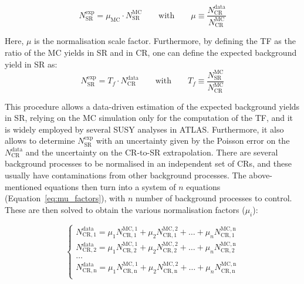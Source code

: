 		\begin{equation}
			N_{\mathrm{SR}}^{\mathrm{exp}} = \mu_{\mathrm{MC}} \cdot N_{\mathrm{SR}}^{\mathrm{MC}} \qquad \mathrm{with}\qquad \mu \equiv \frac{N_{\mathrm{CR}}^{\mathrm{data}}}{N_{\mathrm{CR}}^{\mathrm{MC}}} 
		\label{eq:exp_bkgyield}
		\end{equation}

		\noindent Here, $\mu$ is the normalisation scale factor. Furthermore, by defining the \ac{TF} as the ratio of the \ac{MC} yields in \ac{SR} and in \ac{CR}, one can define the expected background yield in \ac{SR} as: 
		\begin{equation}
			N_{\mathrm{SR}}^{\mathrm{exp}} = T_f \cdot N_{\mathrm{CR}}^{\mathrm{data}} \qquad \mathrm{with} \qquad T_f \equiv \frac{N_{\mathrm{SR}}^{\mathrm{MC}}}{N_{\mathrm{CR}}^{\mathrm{MC}}}
		\label{eq:tf}
		\end{equation}

		\noindent This procedure allows a data-driven estimation of the expected background yields in \ac{SR}, relying on the \ac{MC} simulation only for the computation of the \ac{TF}, and it is widely employed by several \ac{SUSY} analyses in \ac{ATLAS}. Furthermore, it also allows to determine $N_{\mathrm{SR}}^{\mathrm{exp}}$ with an uncertainty given by the Poisson error on the $N_{\mathrm{CR}}^{\mathrm{data}}$ and the uncertainty on the \ac{CR}-to-\ac{SR} extrapolation. There are several background processes to be normalised in an independent set of \acp{CR}, and these usually have contaminations from other background processes. The above-mentioned equations then turn into a system of $n$ equations (Equation~\ref{eq:mu_factors}), with $n$ number of background processes to control. These are then solved to obtain the various normalisation factors ($\mu_i$):

		\begin{equation}
			\begin{cases}
				N_{\mathrm{CR,1}}^{\mathrm{data}} = \mu_1 N_{\mathrm{CR,1}}^{\mathrm{MC,1}} + \mu_2 N_{\mathrm{CR,1}}^{\mathrm{MC,2}} + \dots + \mu_n N_{\mathrm{CR,1}}^{\mathrm{MC,n}} \\
				N_{\mathrm{CR,2}}^{\mathrm{data}} = \mu_1 N_{\mathrm{CR,2}}^{\mathrm{MC,1}} + \mu_2 N_{\mathrm{CR,2}}^{\mathrm{MC,2}} + \dots + \mu_n N_{\mathrm{CR,2}}^{\mathrm{MC,n}} \\
				\dots \\
				N_{\mathrm{CR,n}}^{\mathrm{data}} = \mu_1 N_{\mathrm{CR,n}}^{\mathrm{MC,1}} + \mu_2 N_{\mathrm{CR,n}}^{\mathrm{MC,2}} + \dots + \mu_n N_{\mathrm{CR,n}}^{\mathrm{MC,n}} \\
			\end{cases}
		\label{eq:mu_factors}
		\end{equation}

